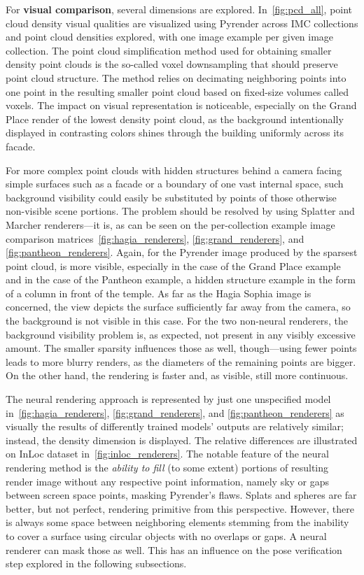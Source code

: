 For \textbf{visual comparison}, several dimensions are explored.
In~\cref{fig:pcd_all}, point cloud density visual qualities are
visualized using Pyrender across IMC collections and point cloud
densities explored, with one image example per given image collection.
The point cloud simplification method used for obtaining smaller density
point clouds is the so-called voxel downsampling that should preserve point
cloud structure. The method relies on decimating neighboring points into
one point in the resulting smaller point cloud based on fixed-size volumes called
voxels. The impact on visual representation is noticeable, especially
on the Grand Place render of the lowest density point cloud, as the background
intentionally displayed in contrasting colors shines through the
building uniformly across its facade.

For more complex point clouds with hidden structures behind a camera
facing simple surfaces such as a facade or a boundary of one vast
internal space, such background visibility could easily be substituted by
points of those otherwise non-visible scene portions. The
problem should be resolved by using Splatter and Marcher renderers---it
is, as can be seen on the per-collection example image comparison
matrices~\cref{fig:hagia_renderers}, \cref{fig:grand_renderers}, and
\cref{fig:pantheon_renderers}. Again, for the Pyrender image produced by
the sparsest point cloud,  is more visible, especially
in the case of the Grand Place example and in the case of the Pantheon
example, a hidden structure example in the form of a column in front of
the temple. As far as the Hagia Sophia image is concerned, the view depicts
the surface sufficiently far away from the camera, so the background is
not visible in this case. For the two non-neural renderers, the background
visibility problem is, as expected, not present in any visibly excessive
amount. The smaller sparsity influences those as well, though---using
fewer points leads to more blurry renders, as the diameters of the
remaining points are bigger. On the other hand, the rendering is faster
and, as visible, still more continuous.

The neural rendering approach is represented by just one unspecified
model in~\cref{fig:hagia_renderers}, \cref{fig:grand_renderers}, and
\cref{fig:pantheon_renderers} as visually the results of differently
trained models' outputs are relatively similar; instead, the density
dimension is displayed. The relative differences are illustrated on InLoc
dataset in~\cref{fig:inloc_renderers}. The notable feature of the
neural rendering method is the \emph{ability to fill} (to some extent)
portions of resulting render image without any respective point
information, namely sky or gaps between screen space points, masking
Pyrender's flaws. Splats and spheres are far better, but not perfect,
rendering primitive from this perspective. However, there is always
some space between neighboring elements stemming from the inability
to cover a surface using circular objects with no overlaps or gaps.
A neural renderer can mask those as well. This has an influence on
the pose verification step explored in the following subsections.


